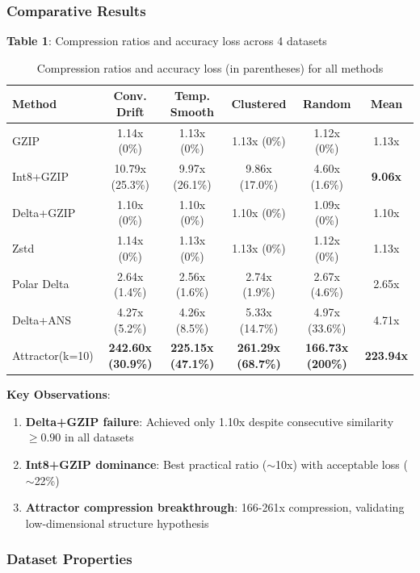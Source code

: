 \documentclass[11pt,a4paper]{article}
\begin{document}
\subsubsection{Comparative Results}

\textbf{Table 1}: Compression ratios and accuracy loss across 4 datasets

\begin{table}[h]
\centering
\small
\begin{tabular}{@{}lcccc|c@{}}
\toprule
\textbf{Method} & \textbf{Conv. Drift} & \textbf{Temp. Smooth} & \textbf{Clustered} & \textbf{Random} & \textbf{Mean} \\
\midrule
GZIP & 1.14x (0\%) & 1.13x (0\%) & 1.13x (0\%) & 1.12x (0\%) & 1.13x \\
Int8+GZIP & 10.79x (25.3\%) & 9.97x (26.1\%) & 9.86x (17.0\%) & 4.60x (1.6\%) & \textbf{9.06x} \\
Delta+GZIP & 1.10x (0\%) & 1.10x (0\%) & 1.10x (0\%) & 1.09x (0\%) & 1.10x \\
Zstd & 1.14x (0\%) & 1.13x (0\%) & 1.13x (0\%) & 1.12x (0\%) & 1.13x \\
Polar Delta & 2.64x (1.4\%) & 2.56x (1.6\%) & 2.74x (1.9\%) & 2.67x (4.6\%) & 2.65x \\
Delta+ANS & 4.27x (5.2\%) & 4.26x (8.5\%) & 5.33x (14.7\%) & 4.97x (33.6\%) & 4.71x \\
Attractor(k=10) & \textbf{242.60x (30.9\%)} & \textbf{225.15x (47.1\%)} & \textbf{261.29x (68.7\%)} & \textbf{166.73x (200\%)} & \textbf{223.94x} \\
\bottomrule
\end{tabular}
\caption{Compression ratios and accuracy loss (in parentheses) for all methods}
\end{table}

\textbf{Key Observations}:

\begin{enumerate}
\item \textbf{Delta+GZIP failure}: Achieved only 1.10x despite consecutive similarity $\geq 0.90$ in all datasets
\item \textbf{Int8+GZIP dominance}: Best practical ratio ($\sim$10x) with acceptable loss ($\sim$22\%)
\item \textbf{Attractor compression breakthrough}: 166-261x compression, validating low-dimensional structure hypothesis
\end{enumerate}

\subsubsection{Dataset Properties}
\end{document}
